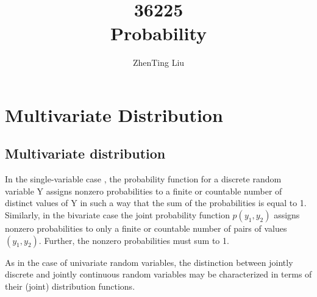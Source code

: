 \documentclass{report}
\title{\Huge{36225}\\Probability}
\author{\huge{ZhenTing Liu}}
\date{}
\begin{document}
\maketitle
\newpage%
\tableofcontents
\pagebreak

\chapter{Multivariate Distribution}
\section{Multivariate distribution}

In the single-variable case , the probability function for a discrete random variable Y assigns nonzero probabilities to a finite or
countable number of distinct values of Y in such a way that the sum of the probabilities
is equal to 1. Similarly, in the bivariate case the joint probability function $p(y_1, y_2)$
assigns nonzero probabilities to only a finite or countable number of pairs of values
$(y_1, y_2)$. Further, the nonzero probabilities must sum to 1.


As in the case of univariate random variables, the distinction between jointly
discrete and jointly continuous random variables may be characterized in terms of
their (joint) distribution functions.


\end{document}
